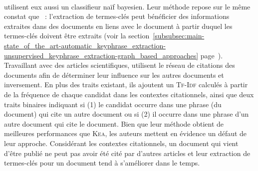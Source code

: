         ~\\ utilisent
        eux aussi un classifieur naïf bayesien. Leur méthode repose sur le même
        constat que ~: l'extraction de termes-clés
        peut bénéficier des informations extraites dans des documents en liens
        avec le document à partir duquel les termes-clés doivent être extraits
        (voir la
        section~\ref{subsubsec:main-state_of_the_art-automatic_keyphrase_extraction-unsupervised_keyphrase_extraction-graph_based_approaches}
        page~\pageref{subsubsec:main-state_of_the_art-automatic_keyphrase_extraction-unsupervised_keyphrase_extraction-graph_based_approaches}).
        Travaillant avec des articles scientifiques,
         utilisent le
        réseau de citations des documents afin de déterminer leur influence sur
        les autres documents et inversement. En plus des traits existant, ils
        ajoutent un \textsc{Tf-Idf} calculés à partir de la fréquence de chaque
        candidat dans les contextes citationnels, ainsi que deux traits binaires
        indiquant si (1) le candidat occurre dans une phrase (du document) qui cite
        un autre document ou si (2) il occurre dans une phrase d'un autre document
        qui cite le document. Bien que leur méthode obtient de meilleures
        performances que \textsc{Kea}, les auteurs mettent en évidence un défaut
        de leur approche. Considérant les contextes citationnels, un document
        qui vient d'être publié ne peut pas avoir été cité par d'autres articles
        et leur extraction de termes-clés pour un document tend à s'améliorer
        dans le temps.

